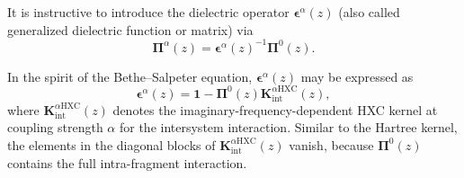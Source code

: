 \documentclass[journal=jctcce,manuscript=article]{achemso}
\begin{document}
It is instructive to introduce the dielectric operator
$\boldsymbol{\epsilon}^\alpha(z)$ (also called generalized dielectric
function or matrix\cite{PhysRevB.47.9892,PhysRevX.6.041002}) via
\begin{equation}
  \label{eq:epsdef}
  \boldsymbol{\Pi}^\alpha(z) =
  \boldsymbol{\epsilon}^\alpha(z)^{-1} \boldsymbol{\Pi}^0(z).
\end{equation}

In the spirit of the Bethe--Salpeter equation,\cite{fetter_walecka_1971}
$\boldsymbol{\epsilon}^\alpha(z)$ 
may be expressed as
\begin{equation}
    \boldsymbol{\epsilon}^\alpha(z) = \mathbf{1} -
    \boldsymbol{\Pi}^0(z) \mathbf{K}^{\alpha\text{HXC}}_{\text{int}}(z),
\end{equation}
where
$\mathbf{K}^{\alpha\text{HXC}}_\text{int}(z)$ denotes the 
imaginary-frequency-dependent HXC kernel at coupling strength $\alpha$
for the intersystem interaction. 
Similar to the Hartree kernel, the elements in the diagonal blocks of
$\mathbf{K}^{\alpha\text{HXC}}_\text{int}(z)$ vanish, because
$\boldsymbol{\Pi}^0(z)$ contains the full intra-fragment
interaction.
\end{document}
